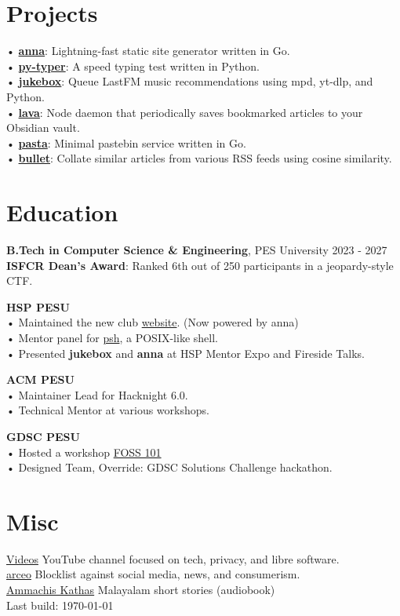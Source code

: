 \documentclass[a4,12pt]{article}
\begin{document}
\section{Projects}
• \textbf{\href{https://github.com/anna-ssg/anna}{anna}}: Lightning-fast static site generator written in Go. \\
• \textbf{\href{https://github.com/polarhive/py-typer}{py-typer}}: A speed typing test written in Python. \\
• \textbf{\href{https://github.com/polarhive/jukebox}{jukebox}}: Queue LastFM music recommendations using mpd, yt-dlp, and Python. \\
• \textbf{\href{https://polarhive.net/lava}{lava}}: Node daemon that periodically saves bookmarked articles to your Obsidian vault. \\
• \textbf{\href{https://polarhive.net/pasta}{pasta}}: Minimal pastebin service written in Go. \\
• \textbf{\href{https://polarhive.net/bullet}{bullet}}: Collate similar articles from various RSS feeds using cosine similarity.


\section{Education}
\textbf{B.Tech in Computer Science \& Engineering}, PES University \hfill 2023 - 2027 \\
\textbf{ISFCR Dean's Award}: Ranked 6th out of 250 participants in a jeopardy-style CTF.

\textbf{HSP PESU} \\
• Maintained the new club \href{https://tiramisu-hsp.netlify.app}{website}. (Now powered by anna) \\
• Mentor panel for \href{https://github.com/psh-shell}{psh}, a POSIX-like shell. \\
• Presented \textbf{jukebox} and \textbf{anna} at HSP Mentor Expo and Fireside Talks.

\textbf{ACM PESU} \\
• Maintainer Lead for Hacknight 6.0. \\
• Technical Mentor at various workshops.

\textbf{GDSC PESU} \\
• Hosted a workshop \href{https://polarhive.net/talks/gdsc-foss-101/}{FOSS 101} \\
• Designed Team, Override: GDSC Solutions Challenge hackathon.

\section{Misc}
\href{https://polarhive.net/videos}{Videos} YouTube channel focused on tech, privacy, and libre software.\\
\href{https://polarhive.net/arceo}{arceo} Blocklist against social media, news, and consumerism. \\
\href{https://polarhive.net/ammachiskathas}{Ammachis Kathas} Malayalam short stories (audiobook) \\

\href{https://github.com/polarhive/resume}{} Last build: \today
\end{document}
